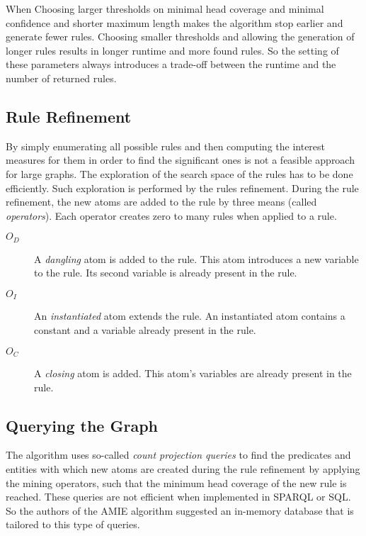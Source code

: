 When Choosing larger thresholds on minimal head coverage and minimal confidence and shorter maximum length makes the algorithm stop earlier and generate fewer rules. Choosing smaller thresholds and allowing the generation of longer rules results in longer runtime and more found rules. So the setting of these parameters always introduces a trade-off between the runtime and the number of returned rules.

\subsection{Rule Refinement}

By simply enumerating all possible rules and then computing the interest measures for them in order to find the significant ones is not a feasible approach for large graphs. The exploration of the search space of the rules has to be done efficiently. Such exploration is performed by the rules refinement. During the rule refinement, the new atoms are added to the rule by three means (called \textit{operators}). Each operator creates zero to many rules when applied to a rule.

\begin{description}
    \item[$O_{D}$] A \textit{dangling} atom is added to the rule. This atom introduces a new variable to the rule. Its second variable is already present in the rule.
    \item[$O_{I}$] An \textit{instantiated} atom extends the rule. An instantiated atom contains a constant and a variable already present in the rule.
    \item[$O_{C}$] A \textit{closing} atom is added. This atom's variables are already present in the rule.
\end{description}

\subsection{Querying the Graph}

The algorithm uses so-called \textit{count projection queries} to find the predicates and entities with which new atoms are created during the rule refinement by applying the mining operators, such that the minimum head coverage of the new rule is reached. These queries are not efficient when implemented in SPARQL or SQL. So the authors of the AMIE algorithm suggested an in-memory database that is tailored to this type of queries.

